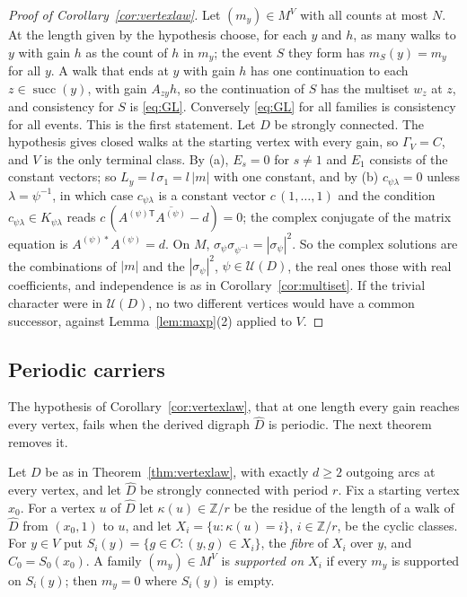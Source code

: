 \begin{proof}[Proof of Corollary~\ref{cor:vertexlaw}]
Let $(m_y)\in M^V$ with all counts at most $N$. At the length given by the hypothesis choose, for each $y$ and $h$, as many walks to $y$ with gain $h$ as the count of $h$ in $m_y$; the event $S$ they form has $m_S(y)=m_y$ for all $y$. A walk that ends at $y$ with gain $h$ has one continuation to each $z\in\operatorname{succ}(y)$, with gain $A_{zy}h$, so the continuation of $S$ has the multiset $w_z$ at $z$, and consistency for $S$ is \eqref{eq:GL}. Conversely \eqref{eq:GL} for all families is consistency for all events. This is the first statement. Let $D$ be strongly connected. The hypothesis gives closed walks at the starting vertex with every gain, so $\Gamma_V=C$, and $V$ is the only terminal class. By (a), $E_s=0$ for $s\ne1$ and $E_1$ consists of the constant vectors; so $L_y=l\,\sigma_1=l\,|m|$ with one constant, and by (b) $c_{\psi\lambda}=0$ unless $\lambda=\psi^{-1}$, in which case $c_{\psi\lambda}$ is a constant vector $c\,(1,\dots,1)$ and the condition $c_{\psi\lambda}\in K_{\psi\lambda}$ reads $c\,(A^{(\psi)\mathsf T}\overline{A^{(\psi)}}-d)=0$; the complex conjugate of the matrix equation is $A^{(\psi)*}A^{(\psi)}=d$. On $M$, $\sigma_\psi\sigma_{\psi^{-1}}=|\sigma_\psi|^2$. So the complex solutions are the combinations of $|m|$ and the $|\sigma_\psi|^2$, $\psi\in\mathcal{U}(D)$, the real ones those with real coefficients, and independence is as in Corollary~\ref{cor:multiset}. If the trivial character were in $\mathcal{U}(D)$, no two different vertices would have a common successor, against Lemma~\ref{lem:maxp}(2) applied to $V$.
\end{proof}

\subsection{Periodic carriers}
The hypothesis of Corollary~\ref{cor:vertexlaw}, that at one length every gain reaches every vertex, fails when the derived digraph $\hat D$ is periodic. The next theorem removes it.

Let $D$ be as in Theorem~\ref{thm:vertexlaw}, with exactly $d\ge2$ outgoing arcs at every vertex, and let $\hat D$ be strongly connected with period $r$. Fix a starting vertex $x_0$. For a vertex $u$ of $\hat D$ let $\kappa(u)\in\mathbb{Z}/r$ be the residue of the length of a walk of $\hat D$ from $(x_0,1)$ to $u$, and let $X_i=\{u:\kappa(u)=i\}$, $i\in\mathbb{Z}/r$, be the cyclic classes. For $y\in V$ put $S_i(y)=\{g\in C:(y,g)\in X_i\}$, the \emph{fibre} of $X_i$ over $y$, and $C_0=S_0(x_0)$. A family $(m_y)\in M^V$ is \emph{supported on $X_i$} if every $m_y$ is supported on $S_i(y)$; then $m_y=0$ where $S_i(y)$ is empty.

